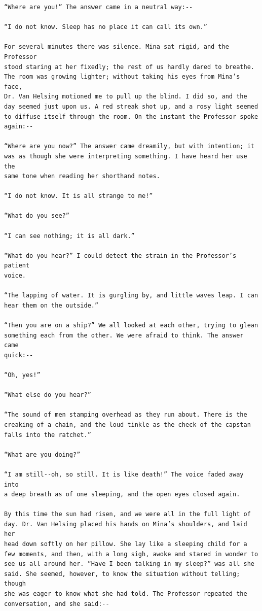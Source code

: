 \documentclass{article}
\begin{document}
\begin{verbatim}
“Where are you!” The answer came in a neutral way:--

“I do not know. Sleep has no place it can call its own.”

For several minutes there was silence. Mina sat rigid, and the Professor
stood staring at her fixedly; the rest of us hardly dared to breathe.
The room was growing lighter; without taking his eyes from Mina’s face,
Dr. Van Helsing motioned me to pull up the blind. I did so, and the
day seemed just upon us. A red streak shot up, and a rosy light seemed
to diffuse itself through the room. On the instant the Professor spoke
again:--

“Where are you now?” The answer came dreamily, but with intention; it
was as though she were interpreting something. I have heard her use the
same tone when reading her shorthand notes.

“I do not know. It is all strange to me!”

“What do you see?”

“I can see nothing; it is all dark.”

“What do you hear?” I could detect the strain in the Professor’s patient
voice.

“The lapping of water. It is gurgling by, and little waves leap. I can
hear them on the outside.”

“Then you are on a ship?” We all looked at each other, trying to glean
something each from the other. We were afraid to think. The answer came
quick:--

“Oh, yes!”

“What else do you hear?”

“The sound of men stamping overhead as they run about. There is the
creaking of a chain, and the loud tinkle as the check of the capstan
falls into the ratchet.”

“What are you doing?”

“I am still--oh, so still. It is like death!” The voice faded away into
a deep breath as of one sleeping, and the open eyes closed again.

By this time the sun had risen, and we were all in the full light of
day. Dr. Van Helsing placed his hands on Mina’s shoulders, and laid her
head down softly on her pillow. She lay like a sleeping child for a
few moments, and then, with a long sigh, awoke and stared in wonder to
see us all around her. “Have I been talking in my sleep?” was all she
said. She seemed, however, to know the situation without telling; though
she was eager to know what she had told. The Professor repeated the
conversation, and she said:--


\end{verbatim}
\end{document}
